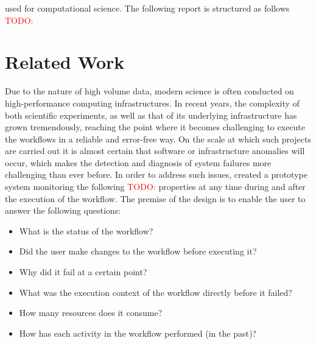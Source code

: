 \documentclass[a4paper,journal]{IEEEtran}
\newcommand{\todo}[1]{\textcolor{red}{TODO: #1}\PackageWarning{TODO:}{#1!}}
\begin{document}
used for computational science. The following report is structured as follows \todo{}
	
	
	\section{Related Work}
	Due to the nature of high volume data, modern science is often conducted on high-performance computing infrastructures. In recent years, the complexity of both scientific experiments, as well as that of its underlying infrastructure has grown tremendously, reaching the point where it becomes challenging to execute the workflows in a reliable and error-free way. On the scale at which such projects are carried out it is almost certain that software or infrastructure anomalies will occur, which makes the detection and diagnosis of system failures more challenging than ever before. In order to address such issues, \citeauthor{valerio2008capturingworkflowevent} created a prototype system monitoring the following \todo{} properties at any time during and after the execution of the workflow. The premise of the design is to enable the user to answer the following questions:
	
	\begin{itemize}
		\item What is the status of the workflow?
		\item Did the user make changes to the workflow before executing it?
		\item Why did it fail at a certain point?
		\item What was the execution context of the workflow directly before it failed?
		\item How many resources does it consume?
		\item How has each activity in the workflow performed (in the past)?
	\end{itemize}
	
\end{document}
